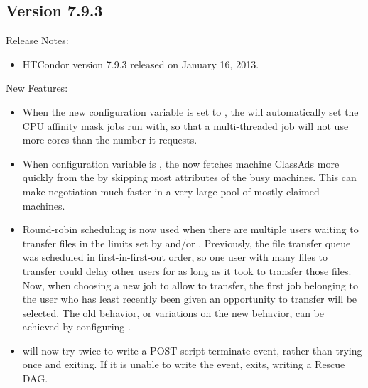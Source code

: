 \subsection*{\label{sec:New-7-9-3}Version 7.9.3}

\noindent Release Notes:

\begin{itemize}

\item HTCondor version 7.9.3 released on January 16, 2013.

\end{itemize}


\noindent New Features:

\begin{itemize}

\item When the new configuration variable 
is set to , 
the  will automatically set the CPU affinity
mask jobs run with, so that a multi-threaded job will not use
more cores than the number it requests.

\item When configuration variable 
is , the 
now fetches machine ClassAds more quickly from the 
 by skipping most attributes of the busy machines.  
This can make negotiation much faster in
a very large pool of mostly claimed machines.

\item Round-robin scheduling is now used when there are multiple users
waiting to transfer files in the limits set by
 and/or
.  Previously, the file transfer
queue was scheduled in first-in-first-out order, so one user with
many files to transfer could delay other users for as long as it took
to transfer those files.  Now, when choosing a new job to allow to
transfer, the first job belonging to the user who has least
recently been given an opportunity to transfer will be selected.
The old behavior, or variations on the new behavior, can be achieved
by configuring .

\item {} will now try twice to write a POST script terminate
event, rather than trying once and exiting. 
If it is unable to write the event,  exits, 
writing a Rescue DAG. 


\end{itemize}

